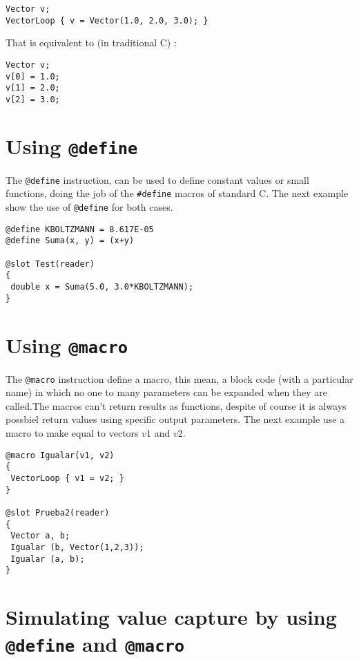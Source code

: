 \documentclass[a4paper,12pt]{article}
\begin{document}
\lstset{language=C}
\begin{lstlisting}
Vector v;
VectorLoop { v = Vector(1.0, 2.0, 3.0); }
\end{lstlisting}

\noindent
That is equivalent to (in traditional C) :

\lstset{language=C}
\begin{lstlisting}
Vector v;
v[0] = 1.0;
v[1] = 2.0;
v[2] = 3.0;
\end{lstlisting}

\section{Using \texttt{@define}}


The \verb'@define' instruction, can be used to define constant values or
small functions, doing the job of the \verb'#define' macros of standard C.
The next example show the use of \verb'@define' for both cases.

\lstset{language=C}
\begin{lstlisting}
@define KBOLTZMANN = 8.617E-05
@define Suma(x, y) = (x+y)

@slot Test(reader)
{
 double x = Suma(5.0, 3.0*KBOLTZMANN);
}
\end{lstlisting}

\section{Using \texttt{@macro}}

The \verb'@macro' instruction define a macro, this mean, a block code (with a
particular name) in which no one to many parameters can be expanded when they
are called.The macros can't return results as functions, despite of course it
is always possbiel return values using specific output parameters. The next
example use a macro to make equal to vectors $v1$ and $v2$.

\lstset{language=C}
\begin{lstlisting}
@macro Igualar(v1, v2)
{
 VectorLoop { v1 = v2; }
}

@slot Prueba2(reader)
{
 Vector a, b;
 Igualar (b, Vector(1,2,3));
 Igualar (a, b);
}
\end{lstlisting}

\section{Simulating value capture by using \texttt{@define} and \texttt{@macro}}
\end{document}
